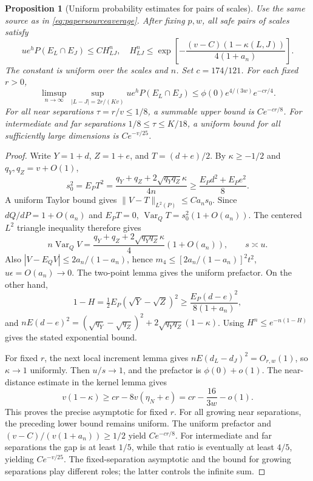 \documentclass[a4paper,11pt]{article}
\newtheorem{proposition}[lemma]{Proposition}
\theoremstyle{remark}
\begin{document}
\begin{proposition}[Uniform probability estimates for pairs of scales]\label{prop:paperallpairs}
Use the same source as in \eqref{eq:papersourceaverage}. After fixing $p,w$, all safe
pairs of scales satisfy
\[
 ue^hP(E_L\cap E_J)\le C H_{LJ}^n,
 \quad H_{LJ}^n\le
 \exp\!\left[-\frac{(v-C)(1-\kappa(L,J))}{4(1+a_n)}\right].
\]
The constant is uniform over the scales and $n$. Set $c=174/121$. For each fixed $r>0$,
\[
 \limsup_{n\to\infty}\sup_{|L-J|=2r/(Kv)}ue^hP(E_L\cap E_J)
 \le\phi(0)e^{4/(3w)}e^{-cr/4}.
\]
For all near separations $\tau=r/v\le1/8$, a summable upper bound is $Ce^{-cr/8}$.
For intermediate and far separations $1/8\le\tau\le K/18$, a uniform bound for all sufficiently large dimensions is $Ce^{-v/25}$.
\end{proposition}
\begin{proof}
Write $Y=1+d$, $Z=1+e$, and $T=(d+e)/2$. By $\kappa\ge-1/2$ and
$q_Y,q_Z=v+O(1)$,
\[
 s_0^2=E_PT^2=\frac{q_Y+q_Z+2\sqrt{q_Yq_Z}\kappa}{4n}
 \ge\frac{E_Pd^2+E_Pe^2}{8}.
\]
A uniform Taylor bound gives $\|V-T\|_{L^2(P)}\le Ca_ns_0$.
Since $dQ/dP=1+O(a_n)$ and $E_PT=0$,
$\operatorname{Var}_QT=s_0^2(1+O(a_n))$.
The centered $L^2$ triangle inequality therefore gives
\[
 n\operatorname{Var}_QV
 =\frac{q_Y+q_Z+2\sqrt{q_Yq_Z}\kappa}{4}(1+O(a_n)),
 \qquad s\asymp u.
\]
Also $|V-E_QV|\le2a_n/(1-a_n)$, hence
$m_4\le[2a_n/(1-a_n)]^2t^2$, $u\epsilon=O(a_n)\to0$.
The two-point lemma gives the uniform prefactor. On the other hand,
\[
 1-H=\tfrac12E_P(\sqrt Y-\sqrt Z)^2
 \ge\frac{E_P(d-e)^2}{8(1+a_n)},
\]
and $nE(d-e)^2=(\sqrt{q_Y}-\sqrt{q_Z})^2+
2\sqrt{q_Yq_Z}(1-\kappa)$. Using $H^n\le e^{-n(1-H)}$ gives the stated exponential bound.

For fixed $r$, the next local increment lemma gives $nE(d_L-d_J)^2=O_{r,w}(1)$,
so $\kappa\to1$ uniformly. Then $u/s\to1$, and the prefactor is $\phi(0)+o(1)$.
The near-distance estimate in the kernel lemma gives
\[
 v(1-\kappa)\ge cr-8v(\eta_N+e)=cr-\frac{16}{3w}-o(1).
\]
This proves the precise asymptotic for fixed $r$.
For all growing near separations, the preceding lower bound remains uniform. The uniform prefactor and
$(v-C)/(v(1+a_n))\ge1/2$ yield $Ce^{-cr/8}$.
For intermediate and far separations the gap is at least $1/5$, while that ratio is eventually at least $4/5$, yielding $Ce^{-v/25}$.
The fixed-separation asymptotic and the bound for growing separations play different roles; the latter controls the infinite sum.


\end{proof}
\end{document}
